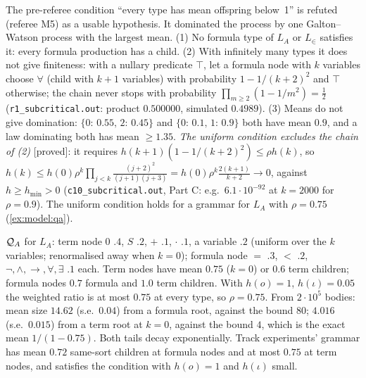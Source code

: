 \begin{remark}\label{rem:model:subcrit}
The pre-referee condition ``every type has mean offspring below~1'' is refuted (referee M5) as a usable hypothesis. It dominated the process by one Galton--Watson process with the largest mean. (1) No formula type of $L_A$ or $L_\in$ satisfies it: every formula production has a child. (2) With infinitely many types it does not give finiteness: with a nullary predicate $\top$, let a formula node with $k$ variables choose $\forall$ (child with $k+1$ variables) with probability $1-1/(k+2)^2$ and $\top$ otherwise; the chain never stops with probability $\prod_{m\ge2}(1-1/m^2)=\tfrac12$ (\texttt{r1\_subcritical.out}: product $0.500000$, simulated $0.4989$). (3) Means do not give domination: $\{0{:}\,0.55,\,2{:}\,0.45\}$ and $\{0{:}\,0.1,\,1{:}\,0.9\}$ both have mean $0.9$, and a law dominating both has mean $\ge1.35$.
\emph{The uniform condition excludes the chain of (2)} [proved]: it requires $h(k+1)(1-1/(k+2)^2)\le\rho h(k)$, so
$h(k)\le h(0)\rho^k\prod_{j<k}\frac{(j+2)^2}{(j+1)(j+3)}=h(0)\rho^k\frac{2(k+1)}{k+2}\to0$, against $h\ge h_{\min}>0$ (\texttt{c10\_subcritical.out}, Part C: e.g.\ $6.1\cdot10^{-92}$ at $k=2000$ for $\rho=0.9$). The uniform condition holds for a grammar for $L_A$ with $\rho=0.75$ (\cref{ex:model:qa}).
\end{remark}

\begin{example}\label{ex:model:qa}
$\mathcal{Q}_A$ for $L_A$: term node $0$ $.4$, $S$ $.2$, $+$ $.1$, $\cdot$ $.1$, a variable $.2$ (uniform over the $k$ variables; renormalised away when $k=0$); formula node $=$ $.3$, $<$ $.2$, $\neg,\wedge,\to,\forall,\exists$ $.1$ each. Term nodes have mean $0.75$ ($k=0$) or $0.6$ term children; formula nodes $0.7$ formula and $1.0$ term children. With $h(o)=1$, $h(\iota)=0.05$ the weighted ratio is at most $0.75$ at every type, so $\rho=0.75$. From $2\cdot10^5$ bodies: mean size $14.62$ (s.e.\ $0.04$) from a formula root, against the bound $80$; $4.016$ (s.e.\ $0.015$) from a term root at $k=0$, against the bound $4$, which is the exact mean $1/(1-0.75)$. Both tails decay exponentially. Track experiments' grammar has mean $0.72$ same-sort children at formula nodes and at most $0.75$ at term nodes, and satisfies the condition with $h(o)=1$ and $h(\iota)$ small.
\end{example}

